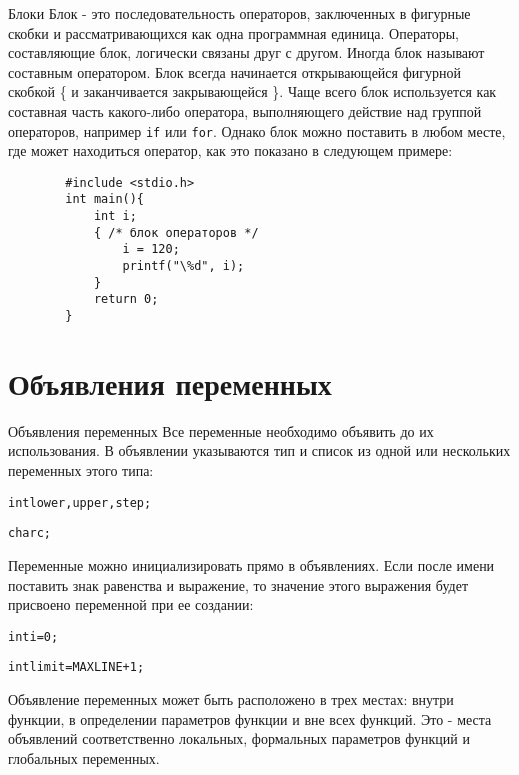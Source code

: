 \documentclass[xcolor=table]{beamer}
\begin{document}
\begin{frame}[fragile]{Блоки}
    Блок - это последовательность операторов, заключенных в фигурные скобки и рассматривающихся как одна программная единица. Операторы, составляющие блок, логически связаны друг с другом. Иногда блок называют составным оператором. Блок всегда начинается открывающейся фигурной скобкой \{ и заканчивается закрывающейся \}. Чаще всего блок используется как составная часть какого-либо оператора, выполняющего действие над группой операторов, например \texttt{if} или \texttt{for}. Однако блок можно поставить в любом месте, где может находиться оператор, как это показано в следующем примере:
    \begin{verbatim}
        #include <stdio.h>
        int main(){
            int i;
            { /* блок операторов */
                i = 120;
                printf("\%d", i);
            }
            return 0;
        }   
    \end{verbatim}    
\end{frame}

\section{Объявления переменных}

\begin{frame}{Объявления переменных}
    Все переменные необходимо объявить до их использования. В объявлении указываются тип и список из одной или нескольких переменных этого типа:
    \begin{alltt}
        int lower, upper, step;
        
        char c;
    \end{alltt}
    
    Переменные можно инициализировать прямо в объявлениях. Если после имени поставить знак равенства и выражение, то значение этого выражения будет присвоено переменной при ее создании:
    \begin{alltt}
        int i = 0;
        
        int limit = MAXLINE + 1;
    \end{alltt}
    
    Объявление переменных может быть расположено в трех местах: внутри функции, в определении параметров функции и вне всех функций. Это - места объявлений соответственно локальных, формальных параметров функций и глобальных переменных.
\end{frame}
\end{document}
